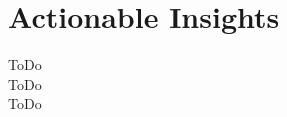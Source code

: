 \section*{Actionable Insights}
\begin{Form}
  \CheckBox[name=01]{} ToDo\\
  \CheckBox[name=02]{} ToDo\\
  \CheckBox[name=10]{} ToDo
\end{Form}
